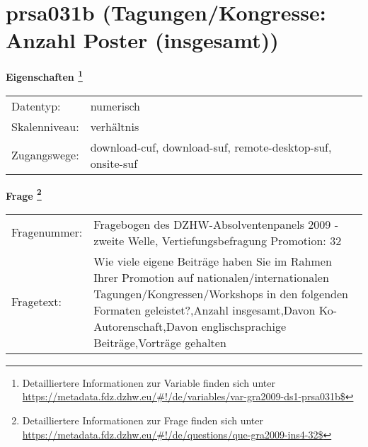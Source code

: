
    \setcounter{footnote}{0}

    \vspace*{-1.8cm}
	\section{prsa031b (Tagungen/Kongresse: Anzahl Poster (insgesamt))}
	\label{section:prsa031b}



    \vspace*{0.5cm}
    \noindent\textbf{Eigenschaften
	\footnote{Detailliertere Informationen zur Variable finden sich unter
		\url{https://metadata.fdz.dzhw.eu/\#!/de/variables/var-gra2009-ds1-prsa031b$}}}\\
	\begin{tabularx}{\hsize}{@{}lX}
	Datentyp: & numerisch \\
	Skalenniveau: & verhältnis \\
	Zugangswege: &
	  download-cuf, 
	  download-suf, 
	  remote-desktop-suf, 
	  onsite-suf
 \\
    \end{tabularx}



				\vspace*{0.5cm}
                \noindent\textbf{Frage
	                \footnote{Detailliertere Informationen zur Frage finden sich unter
		              \url{https://metadata.fdz.dzhw.eu/\#!/de/questions/que-gra2009-ins4-32$}}}\\
				\begin{tabularx}{\hsize}{@{}lX}
					Fragenummer: &
					  Fragebogen des DZHW-Absolventenpanels 2009 - zweite Welle, Vertiefungsbefragung Promotion:
					  32
 \\
					Fragetext: & Wie viele eigene Beiträge haben Sie im Rahmen Ihrer Promotion auf nationalen/internationalen Tagungen/Kongressen/Workshops in den folgenden Formaten geleistet?,Anzahl insgesamt,Davon Ko-Autorenschaft,Davon englischsprachige Beiträge,Vorträge gehalten \\
				\end{tabularx}





